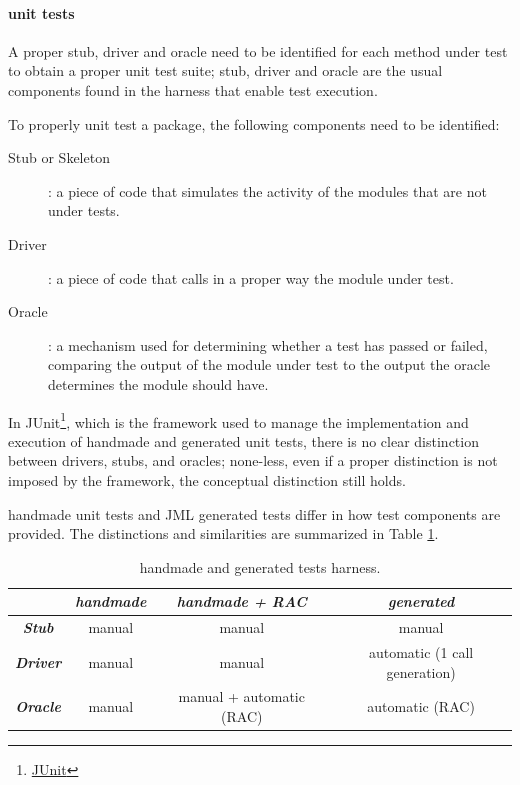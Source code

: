 \documentclass[english]{lni}
\newcommand{\myhref}[2]{\ifpdf\href{#1}{#2}\else\htmladdnormallinkfoot{#2}{#1}\fi}
\begin{document}
\paragraph{unit tests}

A proper stub, driver and oracle need to be identified for each method under test to obtain a proper unit test suite; stub, driver and oracle are the usual components found in the harness that enable test execution\cite{Binder1999}.  

To properly unit test a package, the following components need to be identified:
\begin{description}
\item[Stub or Skeleton]: a piece of code that simulates the activity of the modules that are not under tests.
\item[Driver]: a piece of code that calls in a proper way the module under test.
\item[Oracle]: a mechanism used for determining whether a test has passed or failed, comparing the output of the module under test to the output the oracle determines the module should have.
\end{description}

In JUnit\footnote{\myhref{http://www.junit.org/}{JUnit}}, which is the framework used to manage the implementation and execution of handmade and generated unit tests, there is no clear distinction between drivers, stubs, and oracles; none-less, even if a proper distinction
is not imposed by the framework, the conceptual distinction still holds.

handmade unit tests and JML generated tests differ in how test components are provided.
The distinctions and similarities are summarized in Table \ref{tab:test_harness}.
\begin{table}[htbp]
  \caption{handmade and generated tests harness.}
  \label{tab:test_harness}
  \begin{center}
    \begin{tabular}{|c|c|c|c|}\hline
       & \textbf{\textit{handmade}} & \textbf{\textit{handmade + RAC}} & \textbf{\textit{generated}} \\\hline
      \textbf{\textit{Stub}} & manual & manual & manual\\\hline
      \textbf{\textit{Driver}} & manual & manual & automatic (1 call generation)\\\hline
      \textbf{\textit{Oracle}} & manual & manual + automatic (RAC) & automatic (RAC)\\\hline
    \end{tabular}
  \end{center}
\end{table}
\end{document}
